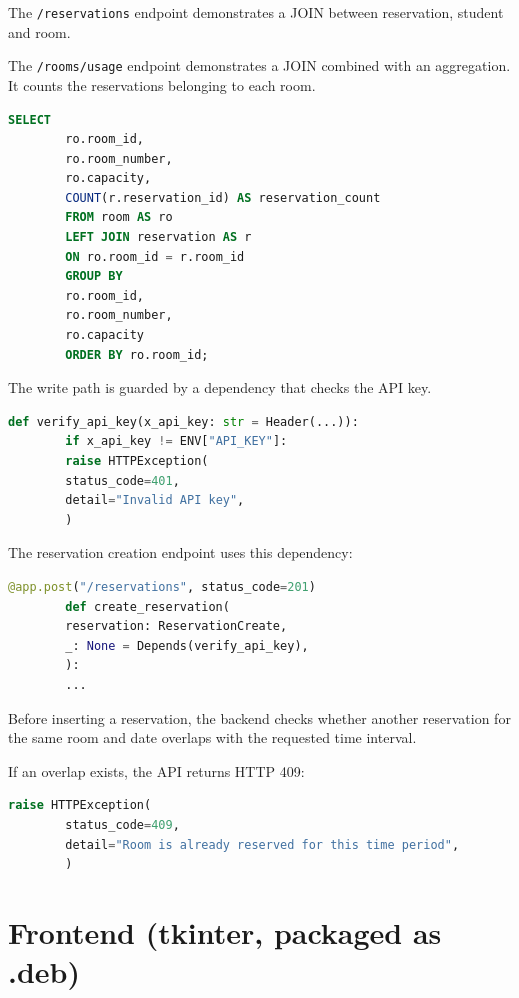 \documentclass[10pt,a4paper]{article}
\begin{document}
	The \texttt{/reservations} endpoint demonstrates a JOIN between
	reservation, student and room.
	
	The \texttt{/rooms/usage} endpoint demonstrates a JOIN combined
	with an aggregation. It counts the reservations belonging to each
	room.
	
	\begin{lstlisting}[language=SQL,
		caption={Query behind GET /rooms/usage (JOIN + aggregation)}]
		SELECT
		ro.room_id,
		ro.room_number,
		ro.capacity,
		COUNT(r.reservation_id) AS reservation_count
		FROM room AS ro
		LEFT JOIN reservation AS r
		ON ro.room_id = r.room_id
		GROUP BY
		ro.room_id,
		ro.room_number,
		ro.capacity
		ORDER BY ro.room_id;
	\end{lstlisting}
	
	The write path is guarded by a dependency that checks the API key.
	
	\begin{lstlisting}[language=Python,
		caption={API-key guard}]
		def verify_api_key(x_api_key: str = Header(...)):
		if x_api_key != ENV["API_KEY"]:
		raise HTTPException(
		status_code=401,
		detail="Invalid API key",
		)
	\end{lstlisting}
	
	The reservation creation endpoint uses this dependency:
	
	\begin{lstlisting}[language=Python,
		caption={Protected POST /reservations}]
		@app.post("/reservations", status_code=201)
		def create_reservation(
		reservation: ReservationCreate,
		_: None = Depends(verify_api_key),
		):
		...
	\end{lstlisting}
	
	Before inserting a reservation, the backend checks whether another
	reservation for the same room and date overlaps with the requested
	time interval.
	
	If an overlap exists, the API returns HTTP 409:
	
	\begin{lstlisting}[language=Python,
		caption={Reservation conflict}]
		raise HTTPException(
		status_code=409,
		detail="Room is already reserved for this time period",
		)
	\end{lstlisting}
	
	
	
	\section{Frontend (tkinter, packaged as .deb)}
	
\end{document}
